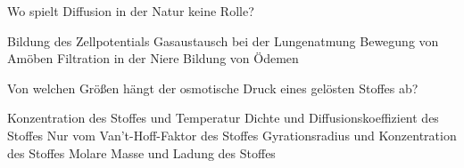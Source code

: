 \documentclass[11pt]{exam}
\begin{document}
\begin{questions}
\vspace{3mm}\question Wo spielt Diffusion in der Natur keine Rolle?

\begin{choices}
	\choice Bildung des Zellpotentials
	\choice Gasaustausch bei der Lungenatmung
	\choice Bewegung von Amöben
	\choice Filtration in der Niere
	\choice Bildung von Ödemen
\end{choices}

\vspace{3mm}\question Von welchen Größen hängt der osmotische Druck eines gelösten Stoffes ab?

\begin{choices}
	\choice Konzentration des Stoffes und Temperatur
	\choice Dichte und Diffusionskoeffizient des Stoffes
	\choice Nur vom Van't-Hoff-Faktor des Stoffes
	\choice Gyrationsradius und Konzentration des Stoffes
	\choice Molare Masse und Ladung des Stoffes
\end{choices}

\vspace{3mm}\end{questions}
\end{document}
